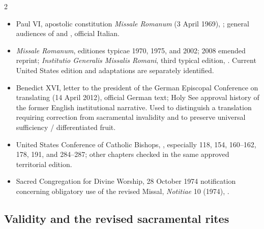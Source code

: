 \begin{multicols}{2}
\begin{itemize}[itemsep=0.12em,topsep=0.15em]
\item Paul VI, apostolic constitution \emph{Missale Romanum} (3 April 1969), ; general audiences of  and , official Italian.
\item \emph{Missale Romanum}, editiones typicae 1970, 1975, and 2002; 2008 emended reprint; \emph{Institutio Generalis Missalis Romani}, third typical edition, . Current United States edition and adaptations are separately identified.
\item Benedict XVI, letter to the president of the German Episcopal Conference on translating  (14 April 2012), official German text; Holy See approval history of the former English institutional narrative. Used to distinguish a translation requiring correction from sacramental invalidity and to preserve universal sufficiency / differentiated fruit.
\item United States Conference of Catholic Bishops, , especially 118, 154, 160--162, 178, 191, and 284--287; other chapters checked in the same approved territorial edition.
\item Sacred Congregation for Divine Worship, 28 October 1974 notification concerning obligatory use of the revised Missal, \emph{Notitiae} 10 (1974), .
\end{itemize}

\subsection*{Validity and the revised sacramental rites}


\end{multicols}
